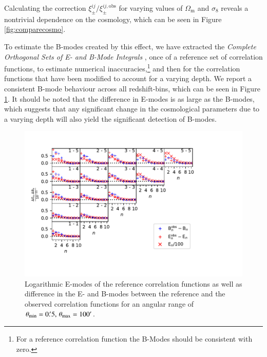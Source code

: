 \documentclass[referee]{aa} %
\renewcommand{\[}{\begin{equation}}
\renewcommand{\]}{\end{equation}}
\renewcommand{\rm}{\mathrm}
\begin{document}
Calculating the correction $\xi_\pm^{ij}/\xi_\pm^{ij,\rm{obs}}$ for varying values of $\Omega_{\rm{m}}$ and $\sigma_8$ reveals a nontrivial dependence on the cosmology, which can be seen in Figure \ref{fig:comparecosmo}.

To estimate the B-modes created by this effect, we have extracted the \emph{Complete Orthogonal Sets of E- and B-Mode Integrals} \citep[COSEBIS, compare][]{2010A&A...520A.116S}, once of a reference set of correlation functions, to estimate numerical inaccuracies,\footnote{For a reference correlation function the B-Modes should be consistent with zero.} and then for the correlation functions that have been modified to account for a varying depth. We report a consistent B-mode behaviour across all redshift-bins, which can be seen in Figure \ref{fig:bmodes_cosebi}. It should be noted that the difference in E-modes is as large as the B-modes, which suggests that any significant change in the cosmological parameters due to a varying depth will also yield the significant detection of B-modes.

\begin{figure}
\centering
\includegraphics[width = \textwidth, trim = {0 1.5cm 2.5cm 0}, clip]{images/eandbmodes0p5t100.pdf}
\caption{Logarithmic E-modes of the reference correlation functions as well as difference in the E- and B-modes between the reference and the observed correlation functions for an angular range of $\theta_{\rm{min}}=0.\!^\prime 5,\,\theta_{\rm{max}}=100\arcmin$.}
\label{fig:bmodes_cosebi}
\end{figure}

\end{document}
